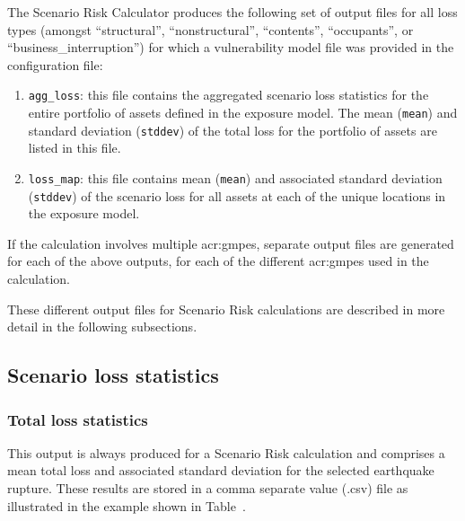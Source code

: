 The Scenario Risk Calculator produces the following set of output files for
all loss types (amongst ``structural'', ``nonstructural'', ``contents'',
``occupants'', or ``business\_interruption'') for which a vulnerability model
file was provided in the configuration file:

\begin{enumerate}

  \item \Verb+agg_loss+: this file contains the aggregated scenario
    loss statistics for the entire portfolio of \glspl{asset} defined
    in the \gls{exposure model}. The mean (\Verb+mean+) and standard
    deviation (\Verb+stddev+) of the total loss for the portfolio of
    \glspl{asset} are listed in this file.

  \item \Verb+loss_map+: this file contains mean (\Verb+mean+) and
    associated standard deviation (\Verb+stddev+) of the scenario loss for all
    \glspl{asset} at each of the unique locations in the \gls{exposure model}.

\end{enumerate}

If the calculation involves multiple \glspl{acr:gmpe}, separate output files
are generated for each of the above outputs, for each of the different
\glspl{acr:gmpe} used in the calculation.

These different output files for Scenario Risk calculations are described in
more detail in the following subsections.


\subsection{Scenario loss statistics}
\label{subsec:scenario_loss_statistics}

\subsubsection{Total loss statistics}
\label{subsubsec:scenario_total_loss_statistics}

This output is always produced for a Scenario Risk calculation and comprises a
mean total loss and associated standard deviation for the selected earthquake
rupture. These results are stored in a comma separate value (.csv) file as
illustrated in the example shown in Table~\label{output:scenario_loss_total}.



